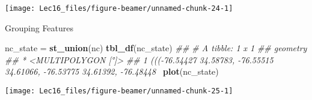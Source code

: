 \documentclass[11pt,ignorenonframetext,]{beamer}
\newenvironment{Shaded}{}{}
\newcommand{\CommentTok}[1]{\textcolor[rgb]{0.38,0.63,0.69}{\textit{#1}}}
\newcommand{\KeywordTok}[1]{\textcolor[rgb]{0.00,0.44,0.13}{\textbf{#1}}}
\newcommand{\NormalTok}[1]{#1}
\newcommand{\OperatorTok}[1]{\textcolor[rgb]{0.40,0.40,0.40}{#1}}
\newcommand{\StringTok}[1]{\textcolor[rgb]{0.25,0.44,0.63}{#1}}
\let\oldShaded\Shaded
\let\endoldShaded\endShaded
\renewenvironment{Shaded}{\footnotesize\begin{spacing}{0.9}\oldShaded}{\endoldShaded\end{spacing}}
\let\oldverbatim\verbatim
\let\endoldverbatim\endverbatim
\newcommand{\scriptoutput}{
  \renewenvironment{Shaded}{\scriptsize\begin{spacing}{0.9}\oldShaded}{\endoldShaded\end{spacing}}
  \renewenvironment{verbatim}{\scriptsize\begin{spacing}{0.9}\oldverbatim}{\endoldverbatim\end{spacing}}
}
\begin{document}
\begin{frame}[fragile,t]{}
\protect\hypertarget{section-2}{}

\scriptoutput

\begin{Shaded}
\end{Shaded}

\begin{center}\texttt{[image: Lec16\_files/figure-beamer/unnamed-chunk-24-1]} \end{center}

\end{frame}

\begin{frame}[fragile,t]{Grouping Features}
\protect\hypertarget{grouping-features}{}

\scriptoutput

\begin{Shaded}
\begin{Highlighting}[]
\NormalTok{nc_state =}\StringTok{ }\KeywordTok{st_union}\NormalTok{(nc)}
\KeywordTok{tbl_df}\NormalTok{(nc_state)}
\CommentTok{## # A tibble: 1 x 1}
\CommentTok{##                                                                    geometry}
\CommentTok{## *                                                        <MULTIPOLYGON [°]>}
\CommentTok{## 1 (((-76.54427 34.58783, -76.55515 34.61066, -76.53775 34.61392, -76.48448~}
\KeywordTok{plot}\NormalTok{(nc_state)}
\end{Highlighting}
\end{Shaded}

\begin{center}\texttt{[image: Lec16\_files/figure-beamer/unnamed-chunk-25-1]} \end{center}

\end{frame}
\end{document}
